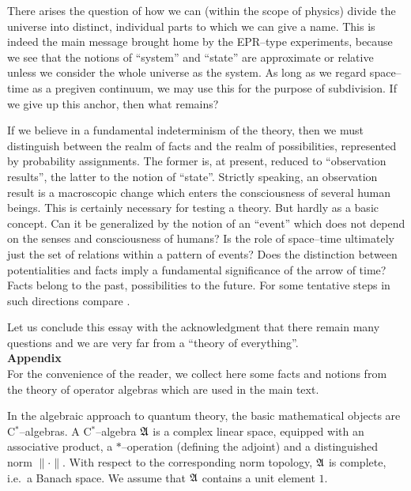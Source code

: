 There arises the question of how we can (within the scope of physics)
divide the universe into distinct, individual parts to which we can
give a name. This is indeed the main message brought home by the
EPR--type experiments, because we see that the notions of ``system''
and ``state'' are approximate or relative unless we consider the whole
universe as the system. As long as we regard space--time as a pregiven
continuum, we may use this for the purpose of subdivision. 
If we give up this anchor, then what remains?

If we believe in a fundamental indeterminism of the
theory, then we must distinguish between the realm of facts and the
realm of possibilities, represented by probability assignments. The 
former is, at present, reduced to ``observation results'', the latter
to the notion of ``state''. Strictly speaking, an observation result is 
a macroscopic change which enters the consciousness of several human
beings. This is certainly necessary for testing a theory. But hardly
as a basic concept. Can it be generalized by the notion of an 
``event'' which does not depend on the senses and consciousness of 
humans? Is the role of space--time ultimately just 
the set of relations within a pattern of events? Does the distinction between 
potentialities and facts imply a fundamental significance of the arrow
of time? Facts belong to the past, possibilities to the future. 
For some tentative steps in such directions compare \cite{Ha2}.

Let us conclude this essay with the acknowledgment that there 
remain many questions and we are very far from a ``theory of
everything''.\\[3mm]
{\noindent \large \bf Appendix} \\[3mm]
\setcounter{section}{1}
\setcounter{equation}{0}
\renewcommand{\theequation}{\Alph{section}.\arabic{equation}}
For the convenience of the reader, we collect here some 
facts and notions from the theory of operator algebras which 
are used in  the main text.

In the algebraic approach to quantum theory, the basic 
mathematical objects are C$^*$--algebras. A C$^*$--algebra
${\mathfrak A}$ is a complex linear space, equipped with an 
associative product, a 
$*$--operation (defining the adjoint) and a distinguished 
norm $\parallel \cdot \parallel$. With respect to the 
corresponding norm topology, ${\mathfrak A}$ is complete, i.e.\ a Banach space. 
We assume that ${\mathfrak A}$ contains a unit
element $1$.

